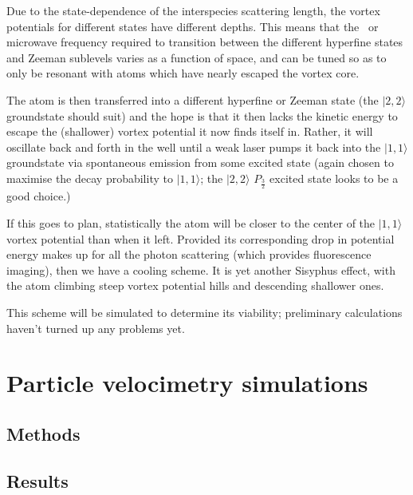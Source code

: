 Due to the state-dependence of the interspecies scattering length, the vortex potentials for different states have different depths. This means that the \rf\ or microwave frequency required to transition between the different hyperfine states and Zeeman sublevels varies as a function of space, and can be tuned so as to only be resonant with atoms which have nearly escaped the vortex core.

The atom is then transferred into a different hyperfine or Zeeman state (the $|2,2\rangle$ groundstate should suit) and the hope is that it then lacks the kinetic energy to escape the (shallower) vortex potential it now finds itself in. Rather, it will oscillate back and forth in the well until a weak laser pumps it back into the $|1,1\rangle$ groundstate via spontaneous emission from some excited state (again chosen to maximise the decay probability to $|1,1\rangle$; the $|2,2\rangle$ $P_\frac32$ excited state looks to be a good choice.)

If this goes to plan, statistically the atom will be closer to the center of the  $|1,1\rangle$ vortex potential than when it left. Provided its corresponding drop in potential energy makes up for all the photon scattering (which provides fluorescence imaging), then we have a cooling scheme. It is yet another Sisyphus effect, with the atom climbing steep vortex potential hills and descending shallower ones.

This scheme will be simulated to determine its viability; preliminary calculations haven't turned up any problems yet.

\section{Particle velocimetry simulations}

\null\newpage
\null\newpage
\null\newpage

\subsection{Methods}

\null\newpage
\null\newpage
\null\newpage

\subsection{Results}

\null\newpage
\null\newpage
\null\newpage
